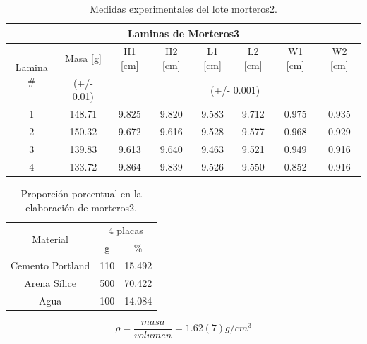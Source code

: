   \begin{table}[H]
 	\centering
 	\begin{tabular}{|c|c|c|c|c|c|c|c|}
 		\hline
 		\multicolumn{8}{|c|}{Laminas de Morteros3}                                                                             \\ \hline
 		\multirow{2}{*}{Lamina \#} & Masa {[}g{]} & H1 {[}cm{]} & H2 {[}cm{]} & L1 {[}cm{]} & L2 {[}cm{]} & W1 {[}cm{]} & W2 {[}cm{]} \\ \cline{2-8} 
 		& (+/- 0.01)   & \multicolumn{6}{c|}{(+/- 0.001)}                                                  \\ \hline
 		1                          & 148.71       & 9.825        & 9.820      & 9.583         & 9.712      & 0.975       & 0.935       \\ \hline
 		2                          & 150.32       & 9.672        & 9.616      & 9.528         & 9.577      & 0.968       & 0.929       \\ \hline
 		3                          & 139.83       & 9.613        & 9.640      & 9.463         & 9.521      & 0.949       & 0.916       \\ \hline
 		4                          & 133.72       & 9.864        & 9.839      & 9.526         & 9.550      & 0.852       & 0.916       \\ \hline
 	\end{tabular}
 	\caption{Medidas experimentales del lote morteros2.}
 	\label{t:medidas-morteros3}
 \end{table}
 
 
 \begin{table}[H]
 	\centering
 	\begin{tabular}{|c|c|c|}
 		\hline
 		\multirow{2}{*}{Material} & \multicolumn{2}{c|}{4 placas} \\ \cline{2-3}
 		& g         	& \%        	\\ \hline
 		Cemento Portland      	& 110      	& 15.492    	\\ \hline
 		Arena Sílice         	& 500      	& 70.422    	\\ \hline
 		Agua                  	& 100     	& 14.084     	\\ \hline
 	\end{tabular}
 	\caption{Proporción porcentual en la elaboración de morteros2.}
 	\label{t:materiales-morteros3}
 \end{table}
 
 \begin{equation} \label{densidad-mor3}
 \rho=\frac{masa}{volumen}=1.62(7) g/cm^3
 \end{equation}
 
